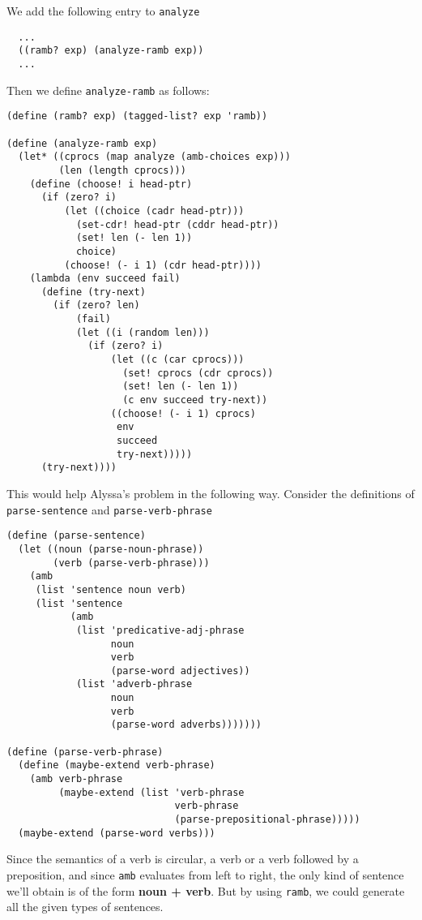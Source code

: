 \documentclass[a4paper,12pt]{article}
\begin{document}
We add the following entry to \lstinline!analyze!

\begin{lstlisting}
  ...
  ((ramb? exp) (analyze-ramb exp))
  ...
\end{lstlisting}

Then we define \lstinline!analyze-ramb! as follows:

\begin{lstlisting}
(define (ramb? exp) (tagged-list? exp 'ramb))

(define (analyze-ramb exp)
  (let* ((cprocs (map analyze (amb-choices exp)))
         (len (length cprocs)))
    (define (choose! i head-ptr)
      (if (zero? i)
          (let ((choice (cadr head-ptr)))
            (set-cdr! head-ptr (cddr head-ptr))
            (set! len (- len 1))
            choice)
          (choose! (- i 1) (cdr head-ptr))))
    (lambda (env succeed fail)
      (define (try-next)
        (if (zero? len)
            (fail)
            (let ((i (random len)))
              (if (zero? i)
                  (let ((c (car cprocs)))
                    (set! cprocs (cdr cprocs))
                    (set! len (- len 1))
                    (c env succeed try-next))
                  ((choose! (- i 1) cprocs)
                   env
                   succeed
                   try-next)))))
      (try-next))))
\end{lstlisting}

This would help Alyssa's problem in the following way.  Consider the
definitions of \lstinline!parse-sentence! and \lstinline!parse-verb-phrase!

\begin{lstlisting}
(define (parse-sentence)
  (let ((noun (parse-noun-phrase))
        (verb (parse-verb-phrase)))
    (amb
     (list 'sentence noun verb)
     (list 'sentence
           (amb
            (list 'predicative-adj-phrase
                  noun
                  verb
                  (parse-word adjectives))
            (list 'adverb-phrase
                  noun
                  verb
                  (parse-word adverbs)))))))

(define (parse-verb-phrase)
  (define (maybe-extend verb-phrase)
    (amb verb-phrase
         (maybe-extend (list 'verb-phrase
                             verb-phrase
                             (parse-prepositional-phrase)))))
  (maybe-extend (parse-word verbs)))
\end{lstlisting}

Since the semantics of a verb is circular, a verb or a verb followed
by a preposition, and since \lstinline!amb! evaluates from left to
right, the only kind of sentence we'll obtain is of the form
\textbf{noun + verb}.  But by using \lstinline!ramb!, we could
generate all the given types of sentences.
\end{document}
